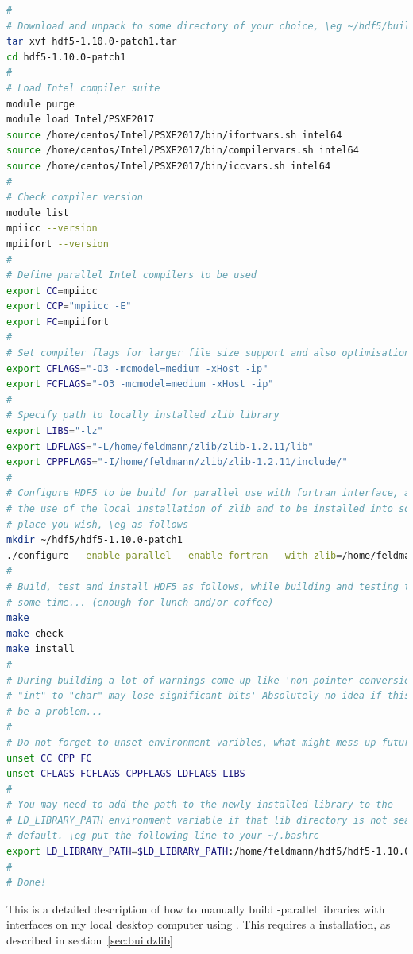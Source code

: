 \documentclass[a4paper, 11pt, DIV=11]{scrartcl}
\begin{document}
\begin{lstlisting}[language=bash]
#
# Download and unpack to some directory of your choice, \eg ~/hdf5/build/.
tar xvf hdf5-1.10.0-patch1.tar
cd hdf5-1.10.0-patch1
#
# Load Intel compiler suite
module purge
module load Intel/PSXE2017
source /home/centos/Intel/PSXE2017/bin/ifortvars.sh intel64
source /home/centos/Intel/PSXE2017/bin/compilervars.sh intel64
source /home/centos/Intel/PSXE2017/bin/iccvars.sh intel64
#
# Check compiler version
module list
mpiicc --version
mpiifort --version
#
# Define parallel Intel compilers to be used
export CC=mpiicc
export CCP="mpiicc -E"
export FC=mpiifort
#
# Set compiler flags for larger file size support and also optimisation level 3
export CFLAGS="-O3 -mcmodel=medium -xHost -ip"
export FCFLAGS="-O3 -mcmodel=medium -xHost -ip"
#
# Specify path to locally installed zlib library
export LIBS="-lz"
export LDFLAGS="-L/home/feldmann/zlib/zlib-1.2.11/lib"
export CPPFLAGS="-I/home/feldmann/zlib/zlib-1.2.11/include/"
#
# Configure HDF5 to be build for parallel use with fortran interface, as well as
# the use of the local installation of zlib and to be installed into some
# place you wish, \eg as follows
mkdir ~/hdf5/hdf5-1.10.0-patch1
./configure --enable-parallel --enable-fortran --with-zlib=/home/feldmann/zlib/zlib-1.2.11 --prefix=/home/feldmann/hdf5/hdf5-1.10.0-patch1
#
# Build, test and install HDF5 as follows, while building and testing take quite
# some time... (enough for lunch and/or coffee)
make
make check
make install
#
# During building a lot of warnings come up like 'non-pointer conversion from
# "int" to "char" may lose significant bits' Absolutely no idea if this might
# be a problem...
#
# Do not forget to unset environment varibles, what might mess up future builds
unset CC CPP FC
unset CFLAGS FCFLAGS CPPFLAGS LDFLAGS LIBS
#
# You may need to add the path to the newly installed library to the
# LD_LIBRARY_PATH environment variable if that lib directory is not searched by
# default. \eg put the following line to your ~/.bashrc
export LD_LIBRARY_PATH=$LD_LIBRARY_PATH:/home/feldmann/hdf5/hdf5-1.10.0-patch1/lib
#
# Done!
\end{lstlisting}

This is a detailed description of how to manually build \mpi-parallel \hdf
libraries with \fortran interfaces on my local desktop computer using
. This requires a  installation, as described in
section~\ref{sec:buildzlib}
\end{document}
